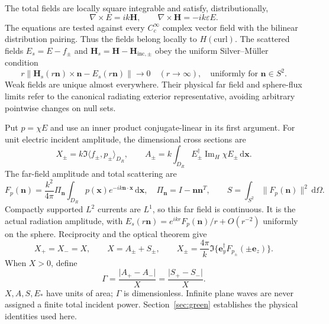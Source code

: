 \documentclass[11pt]{article}
\newcommand{\ImH}{\operatorname{Im}_{\!H}}
\newcommand{\dd}{\,\mathrm{d}}
\newcommand{\ey}{\mathbf e_y}
\newcommand{\ez}{\mathbf e_z}
\newcommand{\ip}[2]{\langle #1,#2\rangle}
\newcommand{\norm}[1]{\lVert #1\rVert}
\newcommand{\abs}[1]{\lvert #1\rvert}
\begin{document}
The total fields are locally square integrable and satisfy, distributionally,
\begin{equation}\label{eq:maxwell}
 \nabla\times E=ik\mathbf H,\qquad
 \nabla\times\mathbf H=-ik\varepsilon E.
\end{equation}
The equations are tested against every $C_c^\infty$ complex vector field with the bilinear distribution pairing. Thus the fields belong locally to $H(\mathrm{curl})$. The scattered fields $E_s=E-f_\pm$ and $\mathbf H_s=\mathbf H-\mathbf H_{\mathrm{inc},\pm}$ obey the uniform Silver--M\"uller condition
\begin{equation}\label{eq:outgoing}
 r\norm{\mathbf H_s(r\mathbf n)\times\mathbf n-E_s(r\mathbf n)}\longrightarrow0
 \quad(r\to\infty),\quad\text{uniformly for }\mathbf n\in S^2.
\end{equation}
Weak fields are unique almost everywhere. Their physical far field and sphere-flux limits refer to the canonical radiating exterior representative, avoiding arbitrary pointwise changes on null sets.

Put $p=\chi E$ and use an inner product conjugate-linear in its first argument. For unit electric incident amplitude, the dimensional cross sections are
\begin{equation}\label{eq:work}
 X_\pm=k\Im\ip{f_\pm}{p_\pm}_{D_R},\qquad
 A_\pm=k\int_{D_R} E_\pm^\dagger\ImH\chi E_\pm\dd\mathbf x.
\end{equation}
The far-field amplitude and total scattering are
\begin{equation}\label{eq:farfield}
 F_p(\mathbf n)=\frac{k^2}{4\pi}\Pi_{\mathbf n}
 \int_{D_R}p(\mathbf x)e^{-ik\mathbf n\cdot\mathbf x}\dd\mathbf x,
 \quad\Pi_{\mathbf n}=I-\mathbf n\mathbf n^T,\qquad
 S=\int_{S^2}\norm{F_p(\mathbf n)}^2\dd\Omega.
\end{equation}
Compactly supported $L^2$ currents are $L^1$, so this far field is continuous. It is the actual radiation amplitude, with $E_s(r\mathbf n)=e^{ikr}F_p(\mathbf n)/r+O(r^{-2})$ uniformly on the sphere. Reciprocity and the optical theorem give
\begin{equation}\label{eq:balance}
 X_+=X_-=X,\qquad X=A_\pm+S_\pm,\qquad
 X_\pm=\frac{4\pi}{k}\Im\{\ey^\dagger F_{p_\pm}(\pm\ez)\}.
\end{equation}
When $X>0$, define
\begin{equation}\label{eq:gamma}
 \Gamma=\frac{\abs{A_+-A_-}}{X}
        =\frac{\abs{S_+-S_-}}{X}.
\end{equation}
$X,A,S,E_*$ have units of area; $\Gamma$ is dimensionless. Infinite plane waves are never assigned a finite total incident power. Section~\ref{sec:green} establishes the physical identities used here.
\end{document}
